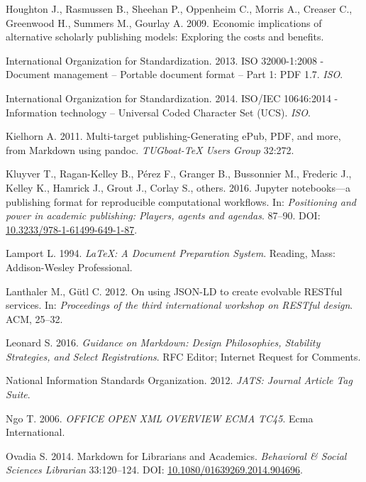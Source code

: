 \documentclass[10pt,fleqn]{wlpeerj}
\begin{document}
\hypertarget{ref-houghtonux5feconomicux5f2009}{}
Houghton J., Rasmussen B., Sheehan P., Oppenheim C., Morris A., Creaser
C., Greenwood H., Summers M., Gourlay A. 2009. Economic implications of
alternative scholarly publishing models: Exploring the costs and
benefits.

\hypertarget{ref-internationalux5forganizationux5fforux5fstandardizationux5fisoux5f2013}{}
International Organization for Standardization. 2013. ISO 32000-1:2008 -
Document management -- Portable document format -- Part 1: PDF 1.7.
\emph{ISO}.

\hypertarget{ref-internationalux5forganizationux5fforux5fstandardizationux5fisoux2fiecux5f2014}{}
International Organization for Standardization. 2014. ISO/IEC 10646:2014
- Information technology -- Universal Coded Character Set (UCS).
\emph{ISO}.

\hypertarget{ref-kielhornux5fmultiux5f2011}{}
Kielhorn A. 2011. Multi-target publishing-Generating ePub, PDF, and
more, from Markdown using pandoc. \emph{TUGboat-TeX Users Group} 32:272.

\hypertarget{ref-kluyverux5fjupyterux5f2016}{}
Kluyver T., Ragan-Kelley B., Pérez F., Granger B., Bussonnier M.,
Frederic J., Kelley K., Hamrick J., Grout J., Corlay S., others. 2016.
Jupyter notebooks---a publishing format for reproducible computational
workflows. In: \emph{Positioning and power in academic publishing:
Players, agents and agendas}. 87--90. DOI:
\href{https://doi.org/10.3233/978-1-61499-649-1-87}{10.3233/978-1-61499-649-1-87}.

\hypertarget{ref-lamportux5flatex:ux5f1994}{}
Lamport L. 1994. \emph{LaTeX: A Document Preparation System}. Reading,
Mass: Addison-Wesley Professional.

\hypertarget{ref-lanthalerux5fjsonldux5f2012}{}
Lanthaler M., Gütl C. 2012. On using JSON-LD to create evolvable RESTful
services. In: \emph{Proceedings of the third international workshop on
RESTful design}. ACM, 25--32.

\hypertarget{ref-rfc7764}{}
Leonard S. 2016. \emph{Guidance on Markdown: Design Philosophies,
Stability Strategies, and Select Registrations}. RFC Editor; Internet
Request for Comments.

\hypertarget{ref-JATS}{}
National Information Standards Organization. 2012. \emph{JATS: Journal
Article Tag Suite}.

\hypertarget{ref-OOXML}{}
Ngo T. 2006. \emph{OFFICE OPEN XML OVERVIEW ECMA TC45}. Ecma
International.

\hypertarget{ref-ovadiaux5fmarkdownux5f2014}{}
Ovadia S. 2014. Markdown for Librarians and Academics. \emph{Behavioral
\& Social Sciences Librarian} 33:120--124. DOI:
\href{https://doi.org/10.1080/01639269.2014.904696}{10.1080/01639269.2014.904696}.
\end{document}
